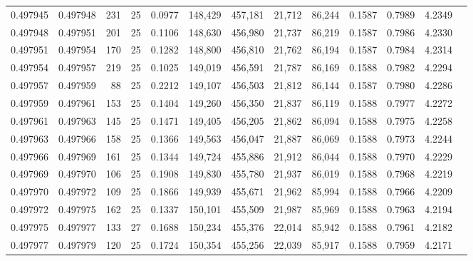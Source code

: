 \begin{tabular}{rrrrrrrrrrrrr}
0.497945 & 0.497948 & 231 &  25 &                                     0.0977 & 148,429 & 457,181 &  21,712 &  86,244 & 0.1587 & 0.7989 & 4.2349 \\
0.497948 & 0.497951 & 201 &  25 &                                     0.1106 & 148,630 & 456,980 &  21,737 &  86,219 & 0.1587 & 0.7986 & 4.2330 \\
0.497951 & 0.497954 & 170 &  25 &                                     0.1282 & 148,800 & 456,810 &  21,762 &  86,194 & 0.1587 & 0.7984 & 4.2314 \\
0.497954 & 0.497957 & 219 &  25 &                                     0.1025 & 149,019 & 456,591 &  21,787 &  86,169 & 0.1588 & 0.7982 & 4.2294 \\
0.497957 & 0.497959 &  88 &  25 &                                     0.2212 & 149,107 & 456,503 &  21,812 &  86,144 & 0.1587 & 0.7980 & 4.2286 \\
0.497959 & 0.497961 & 153 &  25 &                                     0.1404 & 149,260 & 456,350 &  21,837 &  86,119 & 0.1588 & 0.7977 & 4.2272 \\
0.497961 & 0.497963 & 145 &  25 &                                     0.1471 & 149,405 & 456,205 &  21,862 &  86,094 & 0.1588 & 0.7975 & 4.2258 \\
0.497963 & 0.497966 & 158 &  25 &                                     0.1366 & 149,563 & 456,047 &  21,887 &  86,069 & 0.1588 & 0.7973 & 4.2244 \\
0.497966 & 0.497969 & 161 &  25 &                                     0.1344 & 149,724 & 455,886 &  21,912 &  86,044 & 0.1588 & 0.7970 & 4.2229 \\
0.497969 & 0.497970 & 106 &  25 &                                     0.1908 & 149,830 & 455,780 &  21,937 &  86,019 & 0.1588 & 0.7968 & 4.2219 \\
0.497970 & 0.497972 & 109 &  25 &                                     0.1866 & 149,939 & 455,671 &  21,962 &  85,994 & 0.1588 & 0.7966 & 4.2209 \\
0.497972 & 0.497975 & 162 &  25 &                                     0.1337 & 150,101 & 455,509 &  21,987 &  85,969 & 0.1588 & 0.7963 & 4.2194 \\
0.497975 & 0.497977 & 133 &  27 &                                     0.1688 & 150,234 & 455,376 &  22,014 &  85,942 & 0.1588 & 0.7961 & 4.2182 \\
0.497977 & 0.497979 & 120 &  25 &                                     0.1724 & 150,354 & 455,256 &  22,039 &  85,917 & 0.1588 & 0.7959 & 4.2171 \\

\end{tabular}
